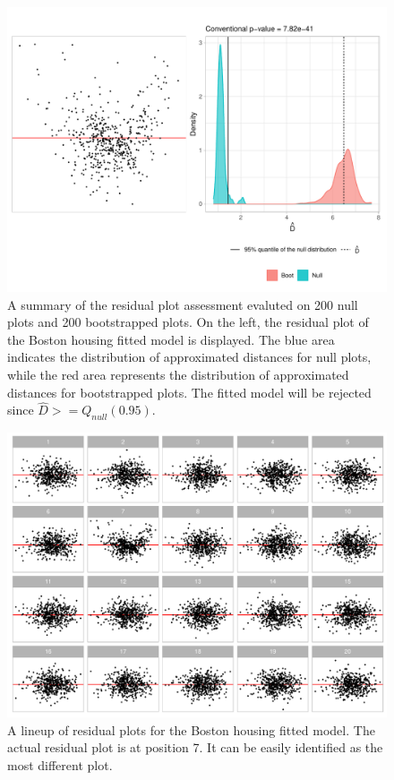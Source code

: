 \documentclass[]{interact}
\theoremstyle{plain}%
\theoremstyle{definition}
\theoremstyle{remark}
\begin{document}
\begin{figure}[!h]

{\centering \includegraphics[width=1\linewidth]{paper_files/figure-latex/boston-check-1} 

}

\caption{A summary of the residual plot assessment evaluted on 200 null plots and 200 bootstrapped plots. On the left, the residual plot of the Boston housing fitted model is displayed. The blue area indicates the distribution of approximated distances for null plots, while the red area represents the distribution of approximated distances for bootstrapped plots. The fitted model will be rejected since $\hat{D} >= Q_{null}(0.95)$.}\label{fig:boston-check}
\end{figure}

\begin{figure}[!h]

{\centering \includegraphics[width=1\linewidth]{paper_files/figure-latex/boston-lineup-1} 

}

\caption{A lineup of residual plots for the Boston housing fitted model. The actual residual plot is at position 7. It can be easily identified as the most different plot.}\label{fig:boston-lineup}
\end{figure}
\end{document}

